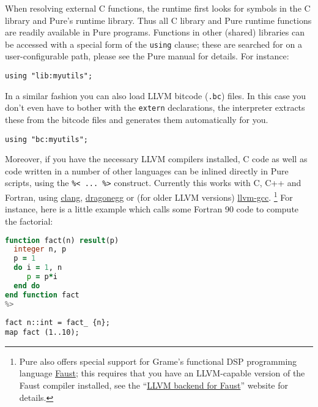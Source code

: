 \documentclass[a4paper,12pt]{article}
\begin{document}
When resolving external C functions, the runtime first looks for symbols in the C library and Pure's runtime library. Thus all C library and Pure runtime functions are readily available in Pure programs. Functions in other (shared) libraries can be accessed with a special form of the \lstinline{using} clause; these are searched for on a user-configurable path, please see the Pure manual for details. For instance:

\begin{lstlisting}
using "lib:myutils";
\end{lstlisting}

In a similar fashion you can also load LLVM bitcode (\texttt{.bc}) files. In this case you don't even have to bother with the \lstinline{extern} declarations, the interpreter extracts these from the bitcode files and generates them automatically for you.

\begin{lstlisting}
using "bc:myutils";
\end{lstlisting}

Moreover, if you have the necessary LLVM compilers installed, C code as well as code written in a number of other languages can be inlined directly in Pure scripts, using the \verb|%< ... %>| construct. Currently this works with C, C++ and Fortran, using \href{http://clang.llvm.org}{clang}, \href{http://dragonegg.llvm.org}{dragonegg} or (for older LLVM versions) \href{http://llvm.org}{llvm-gcc}.%
\footnote{Pure also offers special support for Grame's functional DSP programming language \href{http://faust.grame.fr/}{Faust}; this requires that you have an LLVM-capable version of the Faust compiler installed, see the ``\href{http://www.grame.fr/~letz/faust_llvm.html}{LLVM backend for Faust}'' website for details.} For instance, here is a little example which calls some Fortran 90 code to compute the factorial:

\begin{lstlisting}[language=Fortran]
%< -*- Fortran90 -*-
function fact(n) result(p)
  integer n, p
  p = 1
  do i = 1, n
     p = p*i
  end do
end function fact
%>
\end{lstlisting}

\begin{lstlisting}
fact n::int = fact_ {n};
map fact (1..10);
\end{lstlisting}
\end{document}
